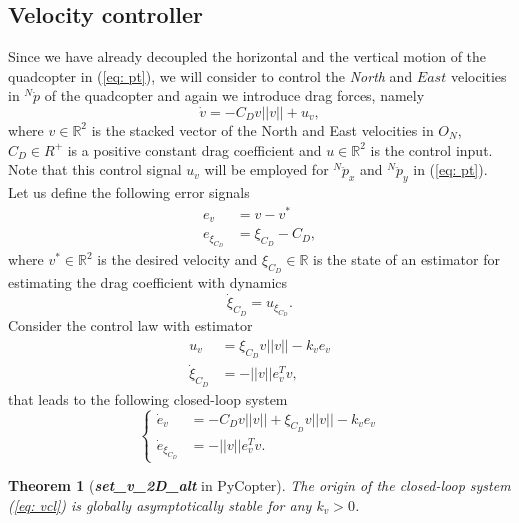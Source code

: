 \documentclass[a4paper, onecolumn]{ieeeconf}
\newcommand{\R}{\ensuremath{\mathbb R}}
\newtheorem{theorem}{\textbf{Theorem}}[section]
\begin{document}
\subsection{Velocity controller}
Since we have already decoupled the horizontal and the vertical motion of the quadcopter in (\ref{eq: pt}), we will consider to control the \emph{North} and $East$ velocities in $^N\dot p$ of the quadcopter and again we introduce drag forces, namely
\begin{equation}
	\dot v = -C_D v||v|| + u_v,
	\label{eq: vdyn}
\end{equation}
where $v\in\R^2$ is the stacked vector of the North and East velocities in $O_N$, $C_D\in R^+$ is a positive constant drag coefficient and $u\in\R^2$ is the control input. Note that this control signal $u_v$ will be employed for $^N\ddot p_x$ and $^N\ddot p_y$ in (\ref{eq: pt}). Let us define the following error signals
\begin{align}
	e_v &= v - v^* \\
	e_{\xi_{C_D}} &= \xi_{C_D} - C_D,
\end{align}
where $v^*\in\R^2$ is the desired velocity and $\xi_{C_D}\in\R$ is the state of an estimator for estimating the drag coefficient with dynamics
\begin{equation}
	\dot\xi_{C_D} = u_{\xi_{C_D}}.
\end{equation}
Consider the control law with estimator
\begin{align}
	u_v &= \xi_{C_D}v||v|| - k_ve_v \label{eq: uvel1} \\
	\dot\xi_{C_D} &= -||v||e_v^Tv, \label{eq: uvel2}
\end{align}
that leads to the following closed-loop system
\begin{equation}
	\begin{cases}
	\dot e_v &= -C_D v||v|| + \xi_{C_D}v||v|| - k_ve_v \\
	\dot e_{\xi_{C_D}} &= -||v||e_v^Tv.
	\end{cases}\label{eq: vcl}
\end{equation}
\begin{theorem}[\emph{\bf set\_v\_2D\_alt} in PyCopter]
	\label{thm: vel}
	The origin of the closed-loop system (\ref{eq: vcl}) is globally asymptotically stable for any $k_v > 0$.
\end{theorem}
\end{document}
